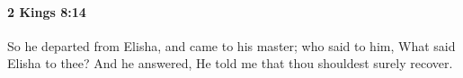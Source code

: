 
		\paragraph{2 Kings 8:14} %
			\label{2KINGS-8-14}

			So he departed from Elisha, and came to his master; who said to him, What said Elisha to thee? And he answered, He told me that thou shouldest surely recover.


